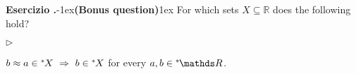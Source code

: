 \documentclass[10pt]{article}
\def\RR{\mathds R}
\def\IMP{\Rightarrow}
\newcommand{\labella}[1]{{\sf\footnotesize #1}\hfill}
\renewenvironment{itemize}
  {\begin{list}{$\triangleright$}{%
   \setlength{\parskip}{0mm}
   \setlength{\topsep}{0mm}
   \setlength{\rightmargin}{0mm}
   \setlength{\listparindent}{0mm}
   \setlength{\itemindent}{0mm}
   \setlength{\labelwidth}{3ex}
   \setlength{\itemsep}{0mm}
   \setlength{\parsep}{0mm}
   \setlength{\partopsep}{0mm}
   \setlength{\labelsep}{1ex}
   \setlength{\leftmargin}{\labelwidth+\labelsep}
   \let\makelabel\labella}}{%
   \end{list}}
\newcounter{ex}
\newenvironment{exercise}{\clearpage\addtocounter{ex}{1}\textbf{Esercizio \theex.\quad}}{}
\def\nsR{{}^*\kern-.2ex\RR}
\def\ns{{}^*\kern-.2ex}
\begin{document}
\begin{exercise}\kern-1ex\textbf{(Bonus question)}\kern1ex
  For which sets $X \subseteq \RR$ does the following hold?
  \begin{itemize}
  \item[2.] $b\approx a\in\ns X \ \IMP\ b\in\ns X$ for every $a,b\in\nsR$.
  \end{itemize}
\end{exercise}
\end{document}
